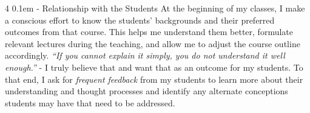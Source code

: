 \documentclass[9pt]{article}
\makeatletter
\def \paragraph {%
    \@startsection{paragraph}%
        {4}%
        \z@%
        {0.1em}
        {-\fontdimen 6 \font}%
        {\normalfont \bfseries}%
    }
\makeatother
\begin{document}
\paragraph{Relationship with the Students}
At the beginning of my classes, I make a conscious effort to know the students' backgrounds and their 
preferred outcomes from that course. This helps me understand them better, formulate relevant lectures during the teaching, and allow me to adjust the course outline accordingly. 
\textit{``If you cannot explain it simply, you do not understand it well enough.''} - I truly believe that and want that as an outcome for my students. To that end, I ask for 
\textit{frequent feedback} from my students
to learn more about their understanding and thought processes and identify any alternate conceptions students may have that need to be addressed. 
%
\end{document}
